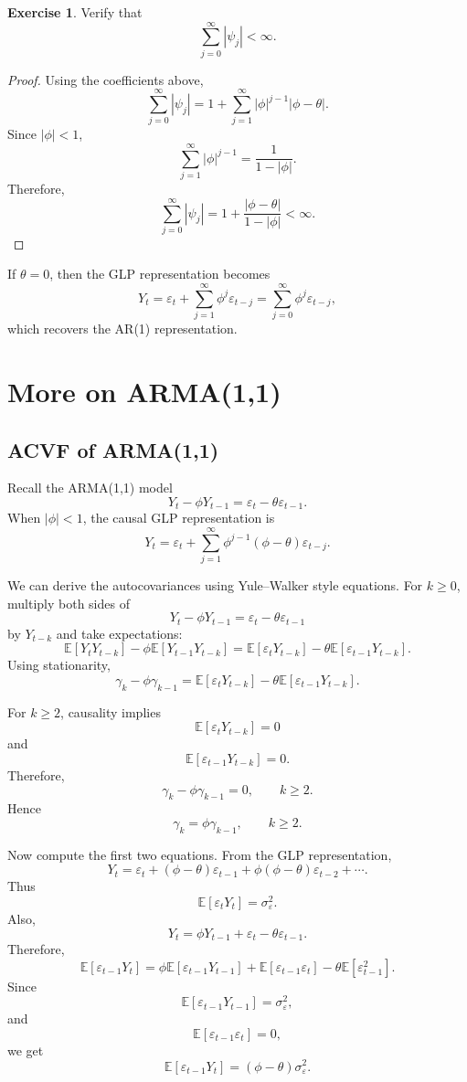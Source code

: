 \documentclass[12pt,oneside]{book}
\numberwithin{equation}{section}
\theoremstyle{definition}
\newtheorem{exercise}{Exercise}[section]
\theoremstyle{plain}
\theoremstyle{remark}
\newcommand{\E}{\mathbb{E}}
\begin{document}
\begin{exercise}
Verify that
\[
\sum_{j=0}^{\infty}|\psi_j|<\infty.
\]
\end{exercise}

\begin{proof}
Using the coefficients above,
\[
\sum_{j=0}^{\infty}|\psi_j|
=
1+\sum_{j=1}^{\infty}|\phi|^{j-1}|\phi-\theta|.
\]
Since $|\phi|<1$,
\[
\sum_{j=1}^{\infty}|\phi|^{j-1}
=
\frac{1}{1-|\phi|}.
\]
Therefore,
\[
\sum_{j=0}^{\infty}|\psi_j|
=
1+\frac{|\phi-\theta|}{1-|\phi|}
<\infty.
\]
\end{proof}

If $\theta=0$, then the GLP representation becomes
\[
Y_t
=
\varepsilon_t+\sum_{j=1}^{\infty}\phi^j\varepsilon_{t-j}
=
\sum_{j=0}^{\infty}\phi^j\varepsilon_{t-j},
\]
which recovers the AR(1) representation.

\section{More on ARMA(1,1)}

\subsection*{ACVF of ARMA(1,1)}

Recall the ARMA(1,1) model
\[
Y_t-\phi Y_{t-1}
=
\varepsilon_t-\theta\varepsilon_{t-1}.
\]
When $|\phi|<1$, the causal GLP representation is
\[
Y_t
=
\varepsilon_t+\sum_{j=1}^{\infty}\phi^{j-1}(\phi-\theta)\varepsilon_{t-j}.
\]

We can derive the autocovariances using Yule--Walker style equations. For $k\geq 0$, multiply both sides of
\[
Y_t-\phi Y_{t-1}
=
\varepsilon_t-\theta\varepsilon_{t-1}
\]
by $Y_{t-k}$ and take expectations:
\[
\E[Y_tY_{t-k}]
-
\phi\E[Y_{t-1}Y_{t-k}]
=
\E[\varepsilon_tY_{t-k}]
-
\theta\E[\varepsilon_{t-1}Y_{t-k}].
\]
Using stationarity,
\[
\gamma_k-\phi\gamma_{k-1}
=
\E[\varepsilon_tY_{t-k}]
-
\theta\E[\varepsilon_{t-1}Y_{t-k}].
\]

For $k\geq 2$, causality implies
\[
\E[\varepsilon_tY_{t-k}]=0
\]
and
\[
\E[\varepsilon_{t-1}Y_{t-k}]=0.
\]
Therefore,
\[
\gamma_k-\phi\gamma_{k-1}=0,
\qquad k\geq 2.
\]
Hence
\[
\gamma_k=\phi\gamma_{k-1},
\qquad k\geq 2.
\]

Now compute the first two equations. From the GLP representation,
\[
Y_t
=
\varepsilon_t+(\phi-\theta)\varepsilon_{t-1}
+\phi(\phi-\theta)\varepsilon_{t-2}
+\cdots.
\]
Thus
\[
\E[\varepsilon_tY_t]=\sigma_\varepsilon^2.
\]
Also,
\[
Y_t=\phi Y_{t-1}+\varepsilon_t-\theta\varepsilon_{t-1}.
\]
Therefore,
\[
\E[\varepsilon_{t-1}Y_t]
=
\phi\E[\varepsilon_{t-1}Y_{t-1}]
+
\E[\varepsilon_{t-1}\varepsilon_t]
-
\theta\E[\varepsilon_{t-1}^2].
\]
Since
\[
\E[\varepsilon_{t-1}Y_{t-1}]=\sigma_\varepsilon^2,
\]
and
\[
\E[\varepsilon_{t-1}\varepsilon_t]=0,
\]
we get
\[
\E[\varepsilon_{t-1}Y_t]
=
(\phi-\theta)\sigma_\varepsilon^2.
\]
\end{document}
